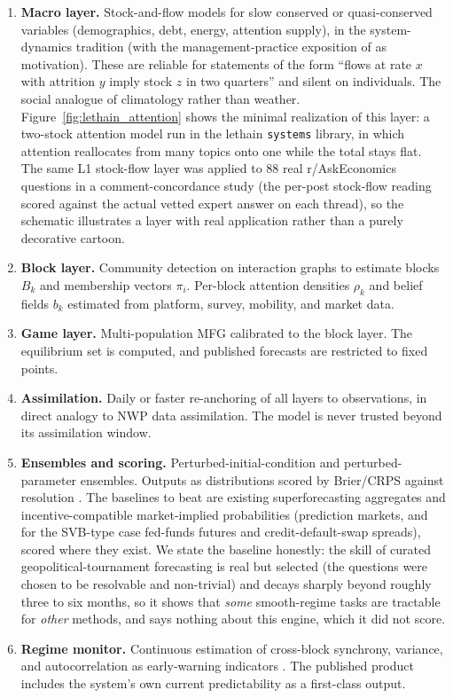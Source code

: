 \documentclass[11pt]{article}
\begin{document}
\begin{enumerate}[label=\textbf{L\arabic*.},itemsep=2pt]
\item \textbf{Macro layer.} Stock-and-flow models for slow conserved or quasi-conserved variables (demographics, debt, energy, attention supply), in the system-dynamics tradition \cite{forrester1961,sterman2000} (with the management-practice exposition of \cite{larson} as motivation). These are reliable for statements of the form ``flows at rate $x$ with attrition $y$ imply stock $z$ in two quarters'' and silent on individuals. The social analogue of climatology rather than weather. Figure~\ref{fig:lethain_attention} shows the minimal realization of this layer: a two-stock attention model run in the lethain \texttt{systems} library, in which attention reallocates from many topics onto one while the total stays flat. The same L1 stock-flow layer was applied to $88$ real r/AskEconomics questions in a comment-concordance study (the per-post stock-flow reading scored against the actual vetted expert answer on each thread), so the schematic illustrates a layer with real application rather than a purely decorative cartoon.
\item \textbf{Block layer.} Community detection on interaction graphs to estimate blocks $B_k$ and membership vectors $\pi_i$. Per-block attention densities $\rho_k$ and belief fields $b_k$ estimated from platform, survey, mobility, and market data.
\item \textbf{Game layer.} Multi-population MFG calibrated to the block layer. The equilibrium set is computed, and published forecasts are restricted to fixed points.
\item \textbf{Assimilation.} Daily or faster re-anchoring of all layers to observations, in direct analogy to NWP data assimilation. The model is never trusted beyond its assimilation window.
\item \textbf{Ensembles and scoring.} Perturbed-initial-condition and perturbed-parameter ensembles. Outputs as distributions scored by Brier/CRPS against resolution \cite{tetlock2015}. The baselines to beat are existing superforecasting aggregates and incentive-compatible market-implied probabilities (prediction markets, and for the SVB-type case fed-funds futures and credit-default-swap spreads), scored where they exist. We state the baseline honestly: the skill of curated geopolitical-tournament forecasting is real but selected (the questions were chosen to be resolvable and non-trivial) and decays sharply beyond roughly three to six months, so it shows that \emph{some} smooth-regime tasks are tractable for \emph{other} methods, and says nothing about this engine, which it did not score.
\item \textbf{Regime monitor.} Continuous estimation of cross-block synchrony, variance, and autocorrelation as early-warning indicators \cite{scheffer2009}. The published product includes the system's own current predictability as a first-class output.
\end{enumerate}
\end{document}
